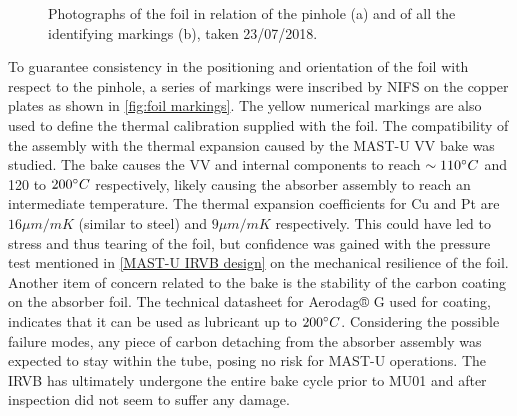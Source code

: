 \begin{figure}[!ht]
\begin{subfigure}{0.63
     \linewidth}
         \label{fig:foil markings2}
     \end{subfigure}
    \caption{Photographs of the foil in relation of the pinhole (a) and of all the identifying markings (b), taken 23/07/2018.}
    \label{fig:foil markings}
\end{figure}

To guarantee consistency in the positioning and orientation of the foil with respect to the pinhole, a series of markings were inscribed by NIFS on the copper plates as shown in \autoref{fig:foil markings}. The yellow numerical markings are also used to define the thermal calibration supplied with the foil.
The compatibility of the assembly with the thermal expansion caused by the MAST-U VV bake was studied. The bake causes the VV and internal components to reach $\sim110\degree C$ and 120 to $200\degree C$ respectively, likely causing the absorber assembly to reach an intermediate temperature. The thermal expansion coefficients for Cu and Pt are $16 \mu m/mK$ (similar to steel) and $9 \mu m/mK$ respectively. This could have led to stress and thus tearing of the foil, but confidence was gained with the pressure test mentioned in \autoref{MAST-U IRVB design} on the mechanical resilience of the foil. Another item of concern related to the bake is the stability of the carbon coating on the absorber foil. The technical datasheet for Aerodag® G used for coating, indicates that it can be used as lubricant up to $200 \degree C$. Considering the possible failure modes, any piece of carbon detaching from the absorber assembly was expected to stay within the tube, posing no risk for MAST-U operations. The IRVB has ultimately undergone the entire bake cycle prior to MU01 and after inspection did not seem to suffer any damage.


